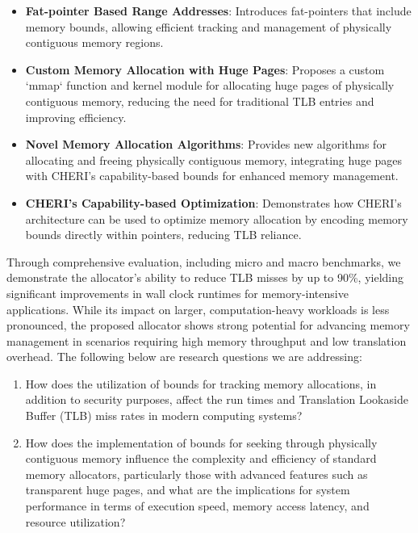 \documentclass[11pt]{article}
\begin{document}
\begin{itemize}
\item \textbf{\textbf{Fat-pointer Based Range Addresses}}: Introduces fat-pointers that include memory bounds, allowing 
efficient tracking and management of physically contiguous memory regions.

\item \textbf{\textbf{Custom Memory Allocation with Huge Pages}}: Proposes a custom `mmap` function and 
kernel module for allocating huge pages of physically contiguous memory, reducing the need for traditional 
TLB entries and improving efficiency.

\item \textbf{\textbf{Novel Memory Allocation Algorithms}}: Provides new algorithms for allocating and freeing 
physically contiguous memory, integrating huge pages with CHERI’s capability-based bounds for enhanced memory management.

\item \textbf{\textbf{CHERI’s Capability-based Optimization}}: Demonstrates how CHERI's architecture can be 
used to optimize memory allocation by encoding memory bounds directly within pointers, reducing TLB reliance.
\end{itemize}

Through comprehensive evaluation, including micro and macro benchmarks, we demonstrate the allocator’s ability 
to reduce TLB misses by up to 90\%, yielding significant improvements in wall clock runtimes for memory-intensive 
applications. While its impact on larger, computation-heavy workloads is less pronounced, 
the proposed allocator shows strong potential for advancing memory management in scenarios requiring 
high memory throughput and low translation overhead. The following below are research questions 
we are addressing:

\begin{enumerate}
\item How does the utilization of bounds for tracking memory allocations, in addition to security purposes, affect the 
run times and Translation Lookaside Buffer (TLB) miss rates in modern computing systems?

\item How does the implementation of bounds for seeking through physically contiguous memory influence the complexity and 
efficiency of standard memory allocators, particularly those with advanced features such as transparent 
huge pages, and what are the implications for system performance in terms of execution speed, memory access 
latency, and resource utilization?
\end{enumerate}



\end{document}
